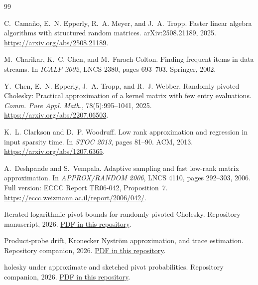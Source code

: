 \documentclass[11pt,a4paper]{article}
\theoremstyle{definition}
\theoremstyle{remark}
\newcommand{\1}{\mathbf 1}
\begin{document}
\begin{thebibliography}{99}

C.~Cama\~no, E.~N. Epperly, R.~A. Meyer, and J.~A. Tropp.
\newblock Faster linear algebra algorithms with structured random matrices.
\newblock arXiv:2508.21189, 2025. \url{https://arxiv.org/abs/2508.21189}.

M.~Charikar, K.~C. Chen, and M.~Farach-Colton.
\newblock Finding frequent items in data streams.
\newblock In \emph{ICALP 2002}, LNCS 2380, pages 693--703. Springer, 2002.

Y.~Chen, E.~N. Epperly, J.~A. Tropp, and R.~J. Webber.
\newblock Randomly pivoted {C}holesky: Practical approximation of a kernel
  matrix with few entry evaluations.
\newblock \emph{Comm. Pure Appl. Math.}, 78(5):995--1041, 2025.
\newblock \url{https://arxiv.org/abs/2207.06503}.

K.~L. Clarkson and D.~P. Woodruff.
\newblock Low rank approximation and regression in input sparsity time.
\newblock In \emph{STOC 2013}, pages 81--90. ACM, 2013.
\newblock \url{https://arxiv.org/abs/1207.6365}.

A.~Deshpande and S.~Vempala.
\newblock Adaptive sampling and fast low-rank matrix approximation.
\newblock In \emph{APPROX/RANDOM 2006}, LNCS 4110, pages 292--303, 2006.
\newblock Full version: ECCC Report TR06-042, Proposition~7.
\newblock \url{https://eccc.weizmann.ac.il/report/2006/042/}.

\newblock Iterated-logarithmic pivot bounds for randomly pivoted {C}holesky.
\newblock Repository manuscript, 2026.
\newblock \href{https://github.com/DiarHaidary/Results/blob/main/manuscripts/background/Iterated_Logarithmic_RPCholesky.pdf}{PDF in this repository}.

\newblock Product-probe drift, {K}ronecker {N}ystr\"om approximation, and
  trace estimation.
\newblock Repository companion, 2026.
\newblock \href{https://github.com/DiarHaidary/Results/blob/main/manuscripts/02-Product-Probe-Drift/Product_Probe_Drift_v2.pdf}{PDF in this repository}.

holesky under approximate and sketched pivot probabilities.
\newblock Repository companion, 2026.
\newblock \href{https://github.com/DiarHaidary/Results/blob/main/manuscripts/06-Robust-Sketched-RPCholesky/RPCholesky_Approximate_Sketched_Pivots.pdf}{PDF in this repository}.


\end{thebibliography}
\end{document}
